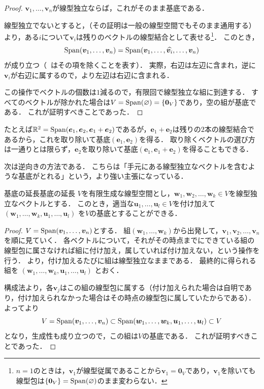 \begin{tleftbar}
\begin{proof}
  $\bm{v}_1, \dots, \bm{v}_n$が線型独立ならば，これがそのまま基底である．

  線型独立でないとすると，（その証明は一般の線型空間でもそのまま通用する）より，ある$i$について$\bm{v}_i$は残りのベクトルの線型結合として表せる\footnote{$n=1$のときは，$\bm{v}_1$が線型従属であることから$\bm{v}_1=\bm{0}_V$であり，$\bm{v}_1$を除いても線型包は$\{\bm{0}_V\}=\operatorname{Span}(\varnothing)$のまま変わらない．}．
  このとき，
  \[
    \operatorname{Span}(\bm{v}_1, \dots, \bm{v}_n)
    = \operatorname{Span}(\bm{v}_1, \dots, \widehat{\bm{v}_i}, \dots, \bm{v}_n)
  \]
  が成り立つ（$\widehat{\phantom{x}}$はその項を除くことを表す）．
  実際，右辺は左辺に含まれ，逆に$\bm{v}_i$が右辺に属するので，より左辺は右辺に含まれる．

  この操作でベクトルの個数は$1$減るので，有限回で線型独立な組に到達する．
  すべてのベクトルが除かれた場合は$V = \operatorname{Span}(\varnothing) = \{\bm{0}_V\}$であり，空の組が基底である．
  これが証明すべきことであった．
\end{proof}
\end{tleftbar}

たとえば$\mathbb{R}^2=\operatorname{Span}(\bm{e}_1,\bm{e}_2,\bm{e}_1+\bm{e}_2)$であるが，$\bm{e}_1+\bm{e}_2$は残りの$2$本の線型結合であるから，これを取り除いて基底$(\bm{e}_1,\bm{e}_2)$を得る．
取り除くベクトルの選び方は一通りとは限らず，$\bm{e}_2$を取り除いて基底$(\bm{e}_1,\bm{e}_1+\bm{e}_2)$を得ることもできる．

次は逆向きの方法である．
こちらは「手元にある線型独立なベクトルを含むような基底がとれる」という，より強い主張になっている．

\begin{theorem}{基底の延長}{基底の延長}
  $V$を有限生成な線型空間とし，$\bm{w}_1, \bm{w}_2, \dots, \bm{w}_k \in V$を線型独立なベクトルとする．
  このとき，適当な$\bm{u}_1, \dots, \bm{u}_l \in V$を付け加えて
  $(\bm{w}_1, \dots, \bm{w}_k, \bm{u}_1, \dots, \bm{u}_l)$
  を$V$の基底とすることができる．
\end{theorem}

\begin{tleftbar}
\begin{proof}
  $V = \operatorname{Span}(\bm{v}_1, \dots, \bm{v}_n)$とする．
  組$(\bm{w}_1, \dots, \bm{w}_k)$から出発して，$\bm{v}_1, \bm{v}_2, \dots, \bm{v}_n$を順に見ていく．
  各ベクトルについて，それがその時点までにできている組の線型包に属さなければ組に付け加え，属していれば付け加えない，という操作を行う．
  より，付け加えるたびに組は線型独立なままである．
  最終的に得られる組を
  $(\bm{w}_1, \dots, \bm{w}_k, \bm{u}_1, \dots, \bm{u}_l)$
  とおく．

  構成法より，各$\bm{v}_j$はこの組の線型包に属する（付け加えられた場合は自明であり，付け加えられなかった場合はその時点の線型包に属していたからである）．
  よってより
  \[
    V = \operatorname{Span}(\bm{v}_1, \dots, \bm{v}_n)
    \subset \operatorname{Span}(\bm{w}_1, \dots, \bm{w}_k, \bm{u}_1, \dots, \bm{u}_l)
    \subset V
  \]
  となり，生成性も成り立つので，この組は$V$の基底である．
  これが証明すべきことであった．
\end{proof}
\end{tleftbar}

